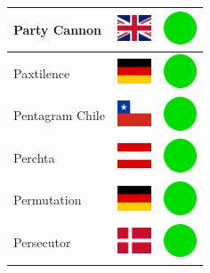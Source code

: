 \documentclass[12pt, a4paper, twoside]{report}
\begin{document}
\begin{center}
\begin{longtable}{|p{5cm}|p{2cm}|p{2cm}|}
 Party Cannon                                               & \includegraphics[width=1cm]{../img/flags/gb} &   \includegraphics[width=1cm]{../likes/y} \\ \hline
 Paxtilence                                                 & \includegraphics[width=1cm]{../img/flags/de} &   \includegraphics[width=1cm]{../likes/y} \\ \hline
 Pentagram Chile                                            & \includegraphics[width=1cm]{../img/flags/cl} &   \includegraphics[width=1cm]{../likes/y} \\ \hline
 Perchta                                                    & \includegraphics[width=1cm]{../img/flags/at} &   \includegraphics[width=1cm]{../likes/y} \\ \hline
 Permutation                                                & \includegraphics[width=1cm]{../img/flags/de} &   \includegraphics[width=1cm]{../likes/y} \\ \hline
 Persecutor                                                 & \includegraphics[width=1cm]{../img/flags/dk} &   \includegraphics[width=1cm]{../likes/y} \\ \hline

\end{longtable}
\end{center}
\end{document}
